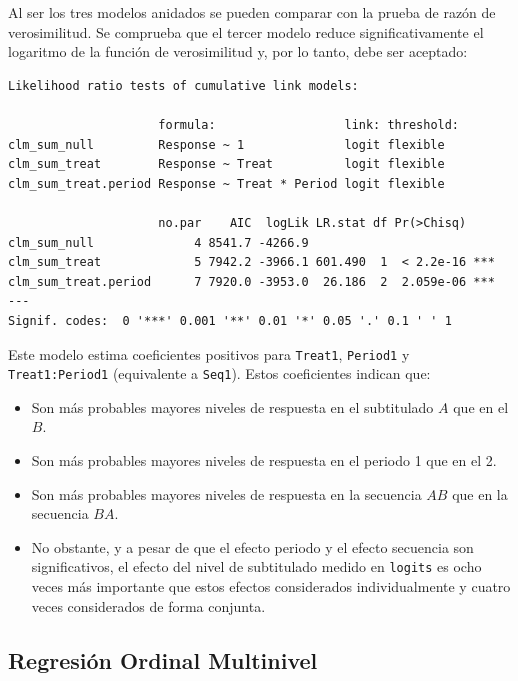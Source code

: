 \documentclass[
  12pt,
  a4paper,
  extrafontsizes,
  onecolumn,
  openright,
  table]{memoir}
\providecommand{\tightlist}{%
  \setlength{\itemsep}{0pt}\setlength{\parskip}{0pt}}\usepackage{longtable,booktabs,array}
\begin{document}
\normalsize

Al ser los tres modelos anidados se pueden comparar con la prueba de
razón de verosimilitud. Se comprueba que el tercer modelo reduce
significativamente el logaritmo de la función de verosimilitud y, por lo
tanto, debe ser aceptado:

\scriptsize

\begin{verbatim}
Likelihood ratio tests of cumulative link models:
 
                     formula:                  link: threshold:
clm_sum_null         Response ~ 1              logit flexible  
clm_sum_treat        Response ~ Treat          logit flexible  
clm_sum_treat.period Response ~ Treat * Period logit flexible  

                     no.par    AIC  logLik LR.stat df Pr(>Chisq)    
clm_sum_null              4 8541.7 -4266.9                          
clm_sum_treat             5 7942.2 -3966.1 601.490  1  < 2.2e-16 ***
clm_sum_treat.period      7 7920.0 -3953.0  26.186  2  2.059e-06 ***
---
Signif. codes:  0 '***' 0.001 '**' 0.01 '*' 0.05 '.' 0.1 ' ' 1
\end{verbatim}

\normalsize

Este modelo estima coeficientes positivos para \texttt{Treat1},
\texttt{Period1} y \texttt{Treat1:Period1} (equivalente a
\texttt{Seq1}). Estos coeficientes indican que:

\begin{itemize}
\tightlist
\item
  Son más probables mayores niveles de respuesta en el subtitulado \(A\)
  que en el \(B\).
\item
  Son más probables mayores niveles de respuesta en el periodo 1 que en
  el 2.
\item
  Son más probables mayores niveles de respuesta en la secuencia \(AB\)
  que en la secuencia \(BA\).
\item
  No obstante, y a pesar de que el efecto periodo y el efecto secuencia
  son significativos, el efecto del nivel de subtitulado medido en
  \texttt{logits} es ocho veces más importante que estos efectos
  considerados individualmente y cuatro veces considerados de forma
  conjunta.
\end{itemize}

\hypertarget{sec-multinivel-2}{%
\subsection{Regresión Ordinal Multinivel}\label{sec-multinivel-2}}
\end{document}
